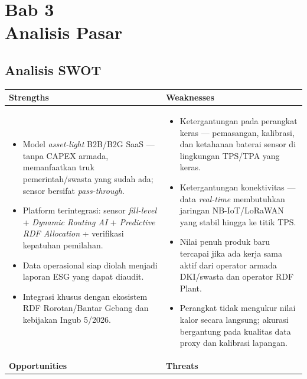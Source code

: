 \section{Bab 3\\Analisis Pasar}

\subsection{Analisis SWOT}
\label{sec:3-1}

\begin{table}[H]
\footnotesize
\renewcommand{\arraystretch}{0.9}
\begin{tabularx}{\textwidth}{|>{\RaggedRight\arraybackslash}X|>{\RaggedRight\arraybackslash}X|}
\hline
\textbf{Strengths} & \textbf{Weaknesses} \\
\hline
\begin{itemize}[leftmargin=*,topsep=2pt]
  \item Model \textit{asset-light} B2B/B2G SaaS --- tanpa CAPEX armada, memanfaatkan truk pemerintah/swasta yang sudah ada; sensor bersifat \textit{pass-through}.
  \item Platform terintegrasi: sensor \textit{fill-level} + \textit{Dynamic Routing AI} + \textit{Predictive RDF Allocation} + verifikasi kepatuhan pemilahan.
  \item Data operasional siap diolah menjadi laporan ESG yang dapat diaudit.
  \item Integrasi khusus dengan ekosistem RDF Rorotan/Bantar Gebang dan kebijakan Ingub 5/2026.
\end{itemize}
&
\begin{itemize}[leftmargin=*,topsep=2pt]
  \item Ketergantungan pada perangkat keras --- pemasangan, kalibrasi, dan ketahanan baterai sensor di lingkungan TPS/TPA yang keras.
  \item Ketergantungan konektivitas --- data \textit{real-time} membutuhkan jaringan NB-IoT/LoRaWAN yang stabil hingga ke titik TPS.
  \item Nilai penuh produk baru tercapai jika ada kerja sama aktif dari operator armada DKI/swasta dan operator RDF Plant.
  \item Perangkat tidak mengukur nilai kalor secara langsung; akurasi bergantung pada kualitas data proxy dan kalibrasi lapangan.
\end{itemize}
\\
\hline
\textbf{Opportunities} & \textbf{Threats} \\

\end{tabularx}
\end{table}
